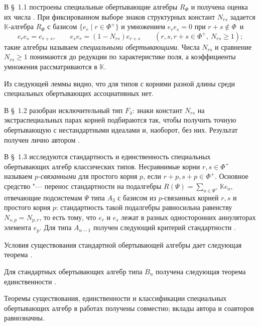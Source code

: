 В \S~1.1 построены специальные обертывающие алгебры $R_\Phi$ и получена оценка
их числа \cite[предложение~1]{smj2023}. При фиксированном выборе знаков
структурных констант $N_{rs}$ задается $\mathbb{K}$-алгебра $R_{\Phi}$ с
базисом $\{e_r \mid r \in \Phi^+\}$ и умножением $e_re_s=0$ при
$r+s\notin\Phi$~и
\[
    e_r e_s = e_{r+s}, \qquad e_s e_r = (1 - N_{rs}) e_{r+s}
    \qquad (r, s, r+s \in \Phi^+,\ N_{rs} \geq 1);
\]
такие алгебры называем \emph{специальными обертывающими}. Числа $N_{rs}$ и
сравнение $N_{rs}\geq1$ понимаются до редукции по характеристике поля, а
коэффициенты умножения рассматриваются в $\mathbb{K}$.


Из следующей леммы \cite[лемма~1.1]{smj2023} видно, что для типов с корнями
разной длины среди специальных обертывающих ассоциативных нет.


В \S~1.2 разобран исключительный тип $F_4$: знаки констант $N_{rs}$ на
экстраспециальных парах корней подбираются так, чтобы получить точную
обертывающую с нестандартными идеалами и, наоборот, без них. Результат получен
лично автором \cite[теорема~1.1]{jsfu2018}.


В \S~1.3 исследуются стандартность и единственность специальных обертывающих
алгебр классических типов. Несравнимые корни $r,s\in\Phi^+$ называем
\emph{$p$-связанными} для простого корня $p$, если $r+p,s+p\in\Phi^+$. Основное
средство "--- перенос стандартности на подалгебры
$R(\Psi)=\sum_{a\in\Psi^+}\mathbb{K}e_a$, отвечающие подсистемам $\Psi$ типа
$A_3$ с базисом из $p$-связанных корней $r,s$ и простого корня $p$:
стандартность такой подалгебры равносильна равенству $N_{s,p}=N_{p,r}$, то есть
тому, что $e_r$ и $e_s$ лежат в разных односторонних аннуляторах элемента
$e_p$. Для типа $A_{n-1}$ получен следующий критерий стандартности
\cite[теорема~1]{imm2020}.


Условия существования стандартной обертывающей алгебры дает следующая теорема
\cite[предложение~2]{smj2023}.


Для стандартных обертывающих алгебр типа $B_n$ получена следующая теорема
единственности \cite[теорема~5]{smj2023}.


Теоремы существования, единственности и классификации специальных обертывающих
алгебр в работах \cite{imm2020, smj2023} получены совместно; вклады автора и
соавторов равнозначны.

